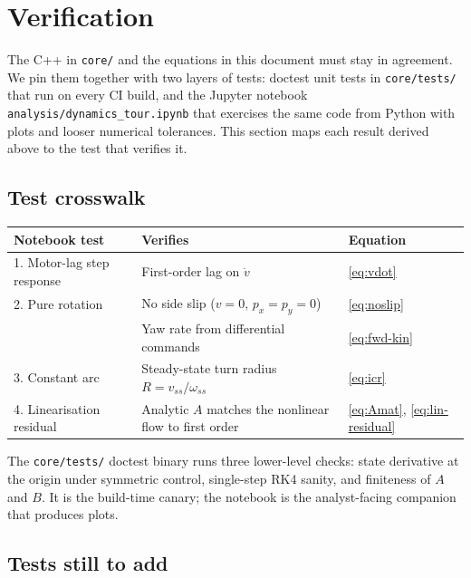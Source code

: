 \section{Verification}
\label{sec:verification}

The C++ in \texttt{core/} and the equations in this document must stay in agreement. We pin them together with two layers of tests: doctest unit tests in \texttt{core/tests/} that run on every CI build, and the Jupyter notebook \texttt{analysis/dynamics\_tour.ipynb} that exercises the same code from Python with plots and looser numerical tolerances. This section maps each result derived above to the test that verifies it.

\subsection{Test crosswalk}

\begin{center}
\begin{tabular}{l l l}
\toprule
\textbf{Notebook test} & \textbf{Verifies} & \textbf{Equation} \\
\midrule
1. Motor-lag step response  & First-order lag on $\dot v$                                & \eqref{eq:vdot} \\
2. Pure rotation            & No side slip ($v = 0$, $p_x = p_y = 0$)                    & \eqref{eq:noslip} \\
                            & Yaw rate from differential commands                        & \eqref{eq:fwd-kin} \\
3. Constant arc             & Steady-state turn radius $R = v_{ss}/\omega_{ss}$          & \eqref{eq:icr} \\
4. Linearisation residual   & Analytic $A$ matches the nonlinear flow to first order    & \eqref{eq:Amat}, \eqref{eq:lin-residual} \\
\bottomrule
\end{tabular}
\end{center}

The \texttt{core/tests/} doctest binary runs three lower-level checks: state derivative at the origin under symmetric control, single-step RK4 sanity, and finiteness of $A$ and $B$. It is the build-time canary; the notebook is the analyst-facing companion that produces plots.

\subsection{Tests still to add}

